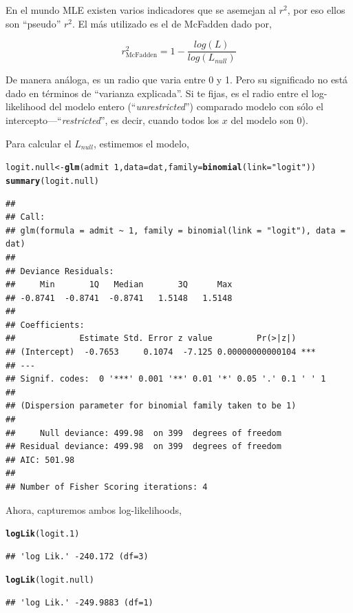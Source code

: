 \documentclass[onesided]{article}\usepackage[]{graphicx}\usepackage[]{color}
\makeatletter
\newcommand{\hlnum}[1]{\textcolor[rgb]{0.686,0.059,0.569}{#1}}%
\newcommand{\hlstr}[1]{\textcolor[rgb]{0.192,0.494,0.8}{#1}}%
\newcommand{\hlopt}[1]{\textcolor[rgb]{0,0,0}{#1}}%
\newcommand{\hlstd}[1]{\textcolor[rgb]{0.345,0.345,0.345}{#1}}%
\newcommand{\hlkwb}[1]{\textcolor[rgb]{0.69,0.353,0.396}{#1}}%
\newcommand{\hlkwc}[1]{\textcolor[rgb]{0.333,0.667,0.333}{#1}}%
\newcommand{\hlkwd}[1]{\textcolor[rgb]{0.737,0.353,0.396}{\textbf{#1}}}%
\newenvironment{kframe}{%
 \def\at@end@of@kframe{}%
 \ifinner\ifhmode%
  \def\at@end@of@kframe{\end{minipage}}%
  \begin{minipage}{\columnwidth}%
 \fi\fi%
 \def\FrameCommand##1{\hskip\@totalleftmargin \hskip-\fboxsep
 \colorbox{shadecolor}{##1}\hskip-\fboxsep
     \hskip-\linewidth \hskip-\@totalleftmargin \hskip\columnwidth}%
 \MakeFramed {\advance\hsize-\width
   \@totalleftmargin\z@ \linewidth\hsize
   \@setminipage}}%
 {\par\unskip\endMakeFramed%
 \at@end@of@kframe}
\newenvironment{knitrout}{}{} %
\makeatother
\begin{document}
En el mundo MLE existen varios indicadores que se asemejan al $r^{2}$, por eso ellos son ``pseudo'' $r^{2}$. El m\'as utilizado es el de McFadden dado por,

\begin{equation}\label{McFadden}
r^{2}_{\text{McFadden}} = 1 - \frac{log(L)}{log(L_{null})}
\end{equation}

De manera an\'aloga, es un radio que varia entre 0 y 1. Pero su significado no est\'a dado en t\'erminos de ``varianza explicada''. Si te fijas, es el radio entre el log-likelihood del modelo entero (``\emph{unrestricted}'') comparado modelo con s\'olo el intercepto---``\emph{restricted}'', es decir, cuando todos los $x$ del modelo son 0). 

Para calcular el $L_{null}$, estimemos el modelo,

\begin{knitrout}
\color{fgcolor}\begin{kframe}
\begin{alltt}
\hlstd{logit.null} \hlkwb{<-} \hlkwd{glm}\hlstd{(admit} \hlopt{~} \hlnum{1}\hlstd{,} \hlkwc{data} \hlstd{= dat,} \hlkwc{family} \hlstd{=} \hlkwd{binomial}\hlstd{(}\hlkwc{link} \hlstd{=} \hlstr{"logit"}\hlstd{))}
\hlkwd{summary}\hlstd{(logit.null)}
\end{alltt}
\begin{verbatim}
## 
## Call:
## glm(formula = admit ~ 1, family = binomial(link = "logit"), data = dat)
## 
## Deviance Residuals: 
##     Min       1Q   Median       3Q      Max  
## -0.8741  -0.8741  -0.8741   1.5148   1.5148  
## 
## Coefficients:
##             Estimate Std. Error z value         Pr(>|z|)    
## (Intercept)  -0.7653     0.1074  -7.125 0.00000000000104 ***
## ---
## Signif. codes:  0 '***' 0.001 '**' 0.01 '*' 0.05 '.' 0.1 ' ' 1
## 
## (Dispersion parameter for binomial family taken to be 1)
## 
##     Null deviance: 499.98  on 399  degrees of freedom
## Residual deviance: 499.98  on 399  degrees of freedom
## AIC: 501.98
## 
## Number of Fisher Scoring iterations: 4
\end{verbatim}
\end{kframe}
\end{knitrout}

Ahora, capturemos ambos log-likelihoods,

\begin{knitrout}
\color{fgcolor}\begin{kframe}
\begin{alltt}
\hlkwd{logLik}\hlstd{(logit.1)}
\end{alltt}
\begin{verbatim}
## 'log Lik.' -240.172 (df=3)
\end{verbatim}
\begin{alltt}
\hlkwd{logLik}\hlstd{(logit.null)}
\end{alltt}
\begin{verbatim}
## 'log Lik.' -249.9883 (df=1)
\end{verbatim}
\end{kframe}
\end{knitrout}
\end{document}
